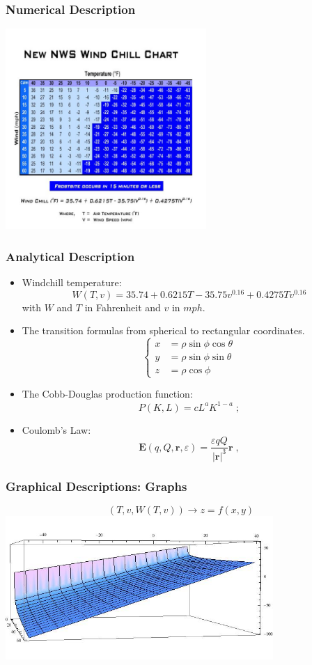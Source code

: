 \begin{frame}
\frametitle{Numerical Description}

\includegraphics[width=3in]{../images/windchill2.jpg}
\end{frame}

\begin{frame}
\frametitle{Analytical Description}

\begin{itemize}
  \item Windchill temperature:
  $$W(T,v)= 35.74+0.6215 T - 35.75 v^{0.16} +0.4275 Tv^{0.16}$$
  with $W$ and $T$ in Fahrenheit and $v$ in $mph$.

 \item The transition formulas from spherical to
    rectangular coordinates.
$$
\begin{cases}
x &= \rho \sin\phi \cos\theta \\
%
y &= \rho \sin\phi \sin\theta \\
%
z &= \rho \cos\phi
\end{cases}
$$

  \item The Cobb-Douglas production function:
  $$P(K,L) = cL^a K^{1-a}\; ;$$


    \item Coulomb's Law: 
    $$\textbf{E}(q, Q, \textbf{r}, \varepsilon) =
    \frac{\varepsilon q Q}{|\textbf{r}|^3} \textbf{r}\; ,$$
 
\end{itemize}

\end{frame}

\begin{frame}
\frametitle{Graphical Descriptions: Graphs}
%
$$(T, v, W(T,v)) \longrightarrow z=f(x,y)$$
%
\includegraphics[width=4in]{../images/windchill-graph.jpg}
\end{frame}

